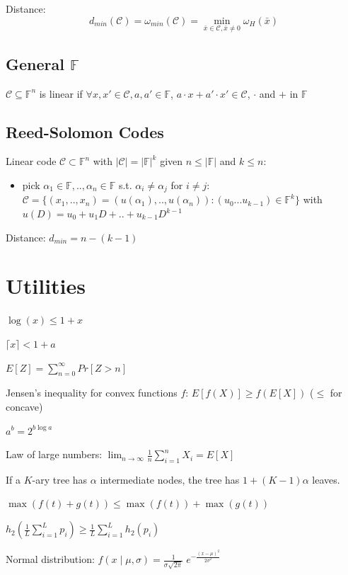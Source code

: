 \documentclass[10pt,a4paper,landscape]{article}
\begin{document}
\begin{multicols*}{4}
Distance: $$d_{min}(\mathcal{C}) = \omega_{min}(\mathcal{C}) = \min_{\bar{x}\in\mathcal{C}, \bar{x}\neq 0} \omega_H (\bar{x})$$

\subsection{General $\mathbb{F}$}
$\mathcal{C} \subseteq \mathbb{F}^n$ is linear if $\forall x,x' \in \mathcal{C}, a,a' \in \mathbb{F}$, $a \cdot x + a' \cdot x' \in \mathcal{C}$, $\cdot$ and $+$ in $\mathbb{F}$

\subsection{Reed-Solomon Codes}
Linear code $\mathcal{C} \subset \mathbb{F}^n$ with $|\mathcal{C}| = |\mathbb{F}|^k$ given $n \leq |\mathbb{F}|$ and $k \leq n$:
\begin{itemize}
 \item pick $\alpha_1 \in \mathbb{F}, .., \alpha_n \in \mathbb{F}$ s.t. $\alpha_i \neq \alpha_j$ for $i \neq j$:
 $\mathcal{C} = \{(x_1,..,x_n) = \left( u(\alpha_1),..,u(\alpha_n)\right) : (u_0 ... u_{k-1}) \in \mathbb{F}^k\}$ with $u(D) = u_0 + u_1D + .. + u_{k-1}D^{k-1}$
\end{itemize}

Distance: $d_{min} = n-(k-1)$




\section{Utilities}
$\log(x) \leq 1 + x$

$\lceil x \rceil < 1 + a$

$E[Z] = \sum_{n=0}^{\infty} Pr[Z > n]$

Jensen's inequality for convex functions $f$: $ E[f(X)] \geq f(E[X])$ ($\leq$ for concave)

$a^b = 2^{ b \log a}$

Law of large numbers: $\lim_{n \rightarrow \infty} \frac{1}{n} \sum_{i=1}^n X_i = E[X]$

If a $K$-ary tree has $\alpha$ intermediate nodes, the tree has $1+(K-1)\alpha$ leaves.


$\max(f(t) + g(t)) \leq \max(f(t)) + \max(g(t))$


$h_2 \left(\frac{1}{L}\sum_{i=1}^L p_i \right) \geq \frac{1}{L} \sum_{i=1}^L h_2(p_i)$

Normal distribution: $f(x \; | \; \mu, \sigma) = \frac{1}{\sigma\sqrt{2\pi} } \; e^{ -\frac{(x-\mu)^2}{2\sigma^2} }$


\end{multicols*}
\end{document}
